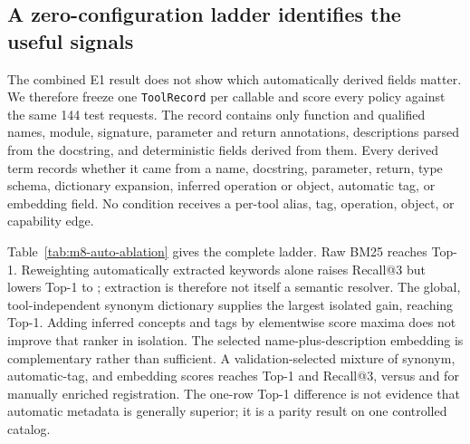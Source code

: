\subsection{A zero-configuration ladder identifies the useful signals}
The combined E1 result does not show which automatically derived fields matter.
We therefore freeze one \texttt{ToolRecord} per callable and score every policy
against the same 144 test requests. The record contains only function and
qualified names, module, signature, parameter and return annotations,
descriptions parsed from the docstring, and deterministic fields derived from
them. Every derived term records whether it came from a name, docstring,
parameter, return, type schema, dictionary expansion, inferred operation or
object, automatic tag, or embedding field. No condition receives a per-tool
alias, tag, operation, object, or capability edge.

Table~\ref{tab:m8-auto-ablation} gives the complete ladder. Raw BM25 reaches
\PaperSixFiveAblationRawTopOne{} Top-1. Reweighting automatically extracted
keywords alone raises Recall@3 but lowers Top-1 to
\PaperSixFiveAblationKeywordTopOne{}; extraction is therefore not itself a
semantic resolver. The global, tool-independent synonym dictionary supplies
the largest isolated gain, reaching \PaperSixFiveAblationSynonymTopOne{}
Top-1. Adding inferred concepts and tags by elementwise score maxima does not
improve that ranker in isolation. The selected name-plus-description embedding
is complementary rather than sufficient. A validation-selected mixture of
synonym, automatic-tag, and embedding scores reaches
\PaperSixFiveAblationAutoTopOne{} Top-1 and
\PaperSixFiveAblationAutoRecallThree{} Recall@3, versus
\PaperSixFiveAblationManualTopOne{} and
\PaperSixFiveAblationManualRecallThree{} for manually enriched registration.
The one-row Top-1 difference is not evidence that automatic metadata is
generally superior; it is a parity result on one controlled catalog.

\begin{table}[H]
\centering
\small
\resizebox{\linewidth}{!}{}
\caption{Frozen-test automatic discovery ladder. A7 has no unique Top-1:
R@3 and R@5 evaluate caps three and five, while validation selects raw union at
$K=10$ for its maximum set recall. ``Manual'' denotes per-tool authored
semantic metadata; all A0--A7 fields come from the same callable record.}
\label{tab:m8-auto-ablation}
\end{table}


